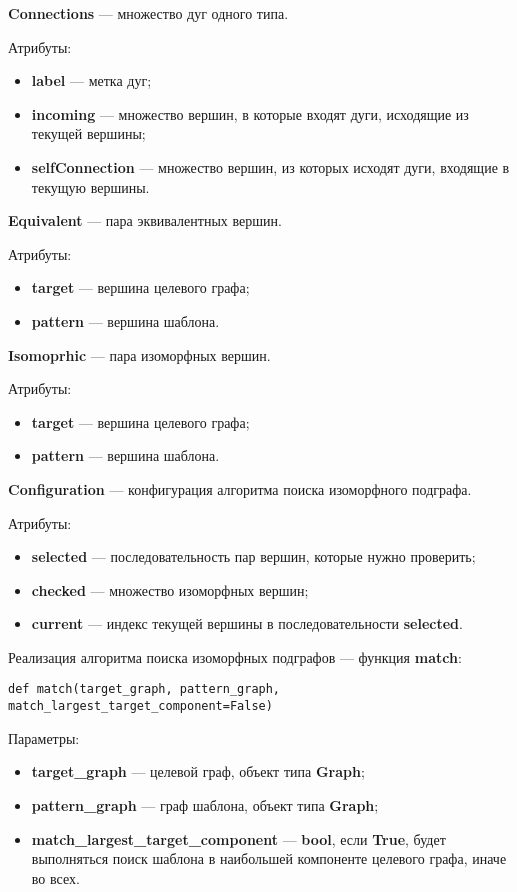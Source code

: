 \textbf{Connections} --- множество дуг одного типа.

Атрибуты:
\begin{itemize}
\item \textbf{label} --- метка дуг;
\item \textbf{incoming} --- множество вершин, в которые входят дуги, исходящие из текущей вершины;
\item \textbf{selfConnection} --- множество вершин, из которых исходят дуги, входящие в текущую вершины.
\end{itemize}

\textbf{Equivalent} --- пара эквивалентных вершин.

Атрибуты:
\begin{itemize}
\item \textbf{target} --- вершина целевого графа;
\item \textbf{pattern} --- вершина шаблона.
\end{itemize}

\textbf{Isomoprhic} --- пара изоморфных вершин.

Атрибуты:
\begin{itemize}
\item \textbf{target} --- вершина целевого графа;
\item \textbf{pattern} --- вершина шаблона.
\end{itemize}

\textbf{Configuration} --- конфигурация алгоритма поиска изоморфного подграфа.

Атрибуты:
\begin{itemize}
\item \textbf{selected} --- последовательность пар вершин, которые нужно проверить;
\item \textbf{checked} --- множество изоморфных вершин;
\item \textbf{current} --- индекс текущей вершины в последовательности \textbf{selected}.
\end{itemize}

Реализация алгоритма поиска изоморфных подграфов --- функция \textbf{match}:

\begin{verbatim}
def match(target_graph, pattern_graph, match_largest_target_component=False)
\end{verbatim}

Параметры:
\begin{itemize}
\item \textbf{target\_graph} --- целевой граф, объект типа \textbf{Graph};
\item \textbf{pattern\_graph} --- граф шаблона, объект типа \textbf{Graph};
\item \textbf{match\_largest\_target\_component} --- \textbf{bool},
если \textbf{True}, будет выполняться поиск шаблона в наибольшей компоненте
целевого графа, иначе во всех.
\end{itemize}

